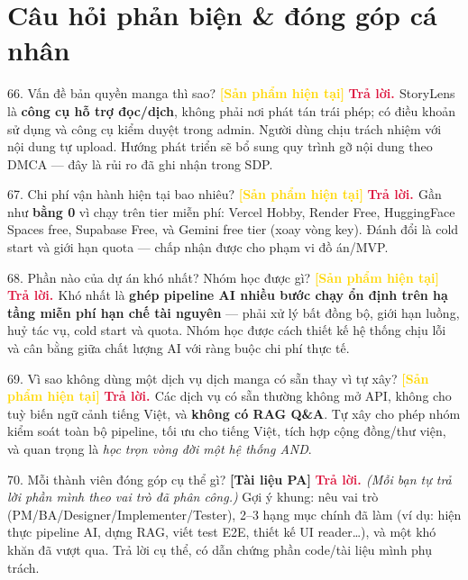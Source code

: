 \documentclass[11pt]{article}
\newcommand{\tagPA}{\textcolor{steel}{\footnotesize\textbf{[Tài liệu PA]}}}
\newcommand{\tagSP}{\textcolor{gold}{\footnotesize\textbf{[Sản phẩm hiện tại]}}}
\newcommand{\A}{\textbf{\textcolor{crimson}{Trả lời. }}}
\begin{document}
\section{Câu hỏi phản biện \& đóng góp cá nhân}

\begin{qa}{66. Vấn đề bản quyền manga thì sao? \tagSP}
\A StoryLens là \textbf{công cụ hỗ trợ đọc/dịch}, không phải nơi phát tán trái phép; có điều khoản sử dụng và công cụ kiểm duyệt trong admin. Người dùng chịu trách nhiệm với nội dung tự upload. Hướng phát triển sẽ bổ sung quy trình gỡ nội dung theo DMCA --- đây là rủi ro đã ghi nhận trong SDP.
\end{qa}

\begin{qa}{67. Chi phí vận hành hiện tại bao nhiêu? \tagSP}
\A Gần như \textbf{bằng 0} vì chạy trên tier miễn phí: Vercel Hobby, Render Free, HuggingFace Spaces free, Supabase Free, và Gemini free tier (xoay vòng key). Đánh đổi là cold start và giới hạn quota --- chấp nhận được cho phạm vi đồ án/MVP.
\end{qa}

\begin{qa}{68. Phần nào của dự án khó nhất? Nhóm học được gì? \tagSP}
\A Khó nhất là \textbf{ghép pipeline AI nhiều bước chạy ổn định trên hạ tầng miễn phí hạn chế tài nguyên} --- phải xử lý bất đồng bộ, giới hạn luồng, huỷ tác vụ, cold start và quota. Nhóm học được cách thiết kế hệ thống chịu lỗi và cân bằng giữa chất lượng AI với ràng buộc chi phí thực tế.
\end{qa}

\begin{qa}{69. Vì sao không dùng một dịch vụ dịch manga có sẵn thay vì tự xây? \tagSP}
\A Các dịch vụ có sẵn thường không mở API, không cho tuỳ biến ngữ cảnh tiếng Việt, và \textbf{không có RAG Q\&A}. Tự xây cho phép nhóm kiểm soát toàn bộ pipeline, tối ưu cho tiếng Việt, tích hợp cộng đồng/thư viện, và quan trọng là \textit{học trọn vòng đời một hệ thống AND}.
\end{qa}

\begin{qa}{70. Mỗi thành viên đóng góp cụ thể gì? \tagPA}
\A \textit{(Mỗi bạn tự trả lời phần mình theo vai trò đã phân công.)} Gợi ý khung: nêu vai trò (PM/BA/Designer/Implementer/Tester), 2--3 hạng mục chính đã làm (ví dụ: hiện thực pipeline AI, dựng RAG, viết test E2E, thiết kế UI reader\ldots), và một khó khăn đã vượt qua. Trả lời cụ thể, có dẫn chứng phần code/tài liệu mình phụ trách.
\end{qa}
\end{document}
